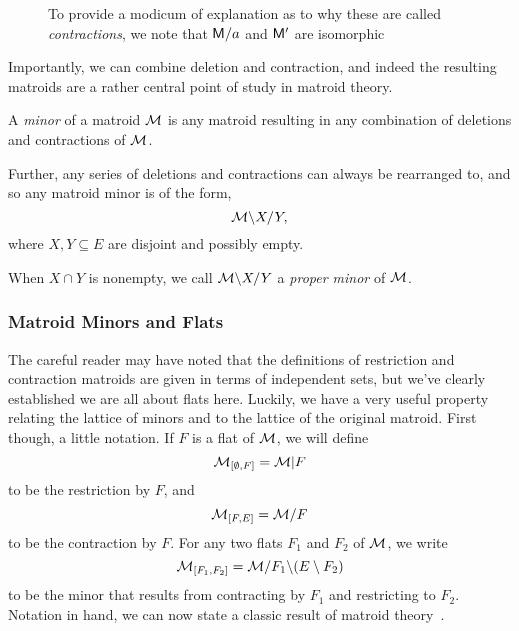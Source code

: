 \documentclass[12pt,oneside]{../../sfsuthesis}
\begin{document}
\begin{figure}[H]
\begin{subfigure}[t]{.45\textwidth}
    \end{subfigure}
    \caption{To provide a modicum of explanation as to why these are called \emph{contractions}, we note that \( \mathsf{M}/a \) and \( \mathsf{M}' \) are isomorphic}\label{fig:contractionMatroid}

\end{figure}

Importantly, we can combine deletion and contraction, and indeed the resulting matroids are a rather central point of study in matroid theory.

\begin{definition}\th\label{def:minor}
    A \emph{minor} of a matroid \( \mathcal{M} \) is any matroid resulting in any combination of deletions and contractions of \( \mathcal{M} \).

    Further, any series of deletions and contractions can always be rearranged to, and so any matroid minor is of the form,
    \[
        \mathcal{M} \backslash X / Y,
    \]
    where \( X, Y \subseteq E \) are disjoint and possibly empty.

    When \( X \cap Y \) is nonempty, we call \( \mathcal{M} \backslash X / Y \) a \emph{proper minor} of \( \mathcal{M} \).
\end{definition}

\subsubsection{Matroid Minors and Flats}

The careful reader may have noted that the definitions of restriction and contraction matroids are given in terms of independent sets, but we've clearly established we are all about flats here.
Luckily, we have a very useful property relating the lattice of minors and to the lattice of the original matroid.
First though, a little notation.
If \( F \) is a flat of \( \mathcal{M} \), we will define
\[
    \mathcal{M}_{[\emptyset, F]} = \mathcal{M}|F
\]
to be the restriction by \( F \), and
\[
    \mathcal{M}_{[F, E]} = \mathcal{M}  / F
\]
to be the contraction by \( F \).
For any two flats \( F_1 \) and \( F_2 \) of \( \mathcal{M} \), we write
\[
    \mathcal{M}_{[F_1, F_2]} = \mathcal{M} / F_1 \backslash (E \setminus F_2)
\]
to be the minor that results from contracting by \( F_1 \) and restricting to \( F_2 \).
Notation in hand, we can now state a classic result of matroid theory~\cite[p.~116]{oxleyMatroidTheory2011}.
\end{document}
